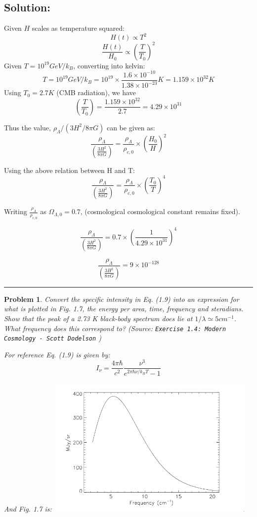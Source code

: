 \documentclass[11pt]{article}
\newenvironment{solution}{\subsection*{Solution:}}{\vspace{0.5cm} \hrule \vspace{0.7cm}}
\newtheorem{problem}{Problem}
\begin{document}
\begin{solution}
	Given $H$ scales as temperature squared:
	$$ H(t) \propto T^2 $$
	$$ \frac{H(t)}{H_0} \propto \left(\frac{T}{T_0}\right)^2 $$
	Given $T = 10^{19} GeV/k_B$, converting into kelvin:
	$$ T = 10^{19} GeV/k_B = 10^{19} \times \frac{1.6 \times 10^{-10}}{1.38
	\times 10^{-23}} K = 1.159 \times 10^{32} K$$
	Using $T_0 = 2.7 K$ (CMB radiation), we have
	$$ \left(\frac{T}{T_0}\right) = \frac{1.159 \times 10^{32} }{2.7} = 4.29
	\times 10^{31}$$

	Thus the value, $\rho_\Lambda/(3H^2/8\pi G) $ can be given as:
	$$ \frac{\rho_\Lambda}{\left(\frac{3H^2}{8\pi G}\right)} =
	\frac{\rho_\Lambda}{\rho_{c,0}} \times \left( \frac{H_0}{H} \right)^2$$

	Using the above relation between H and T:
	$$ \frac{\rho_\Lambda}{\left(\frac{3H^2}{8\pi G}\right)} =
	\frac{\rho_\Lambda}{\rho_{c,0}} \times \left( \frac{T_0}{T} \right)^4$$

	Writing $\frac{\rho_\Lambda}{\rho_{c,0}}$ as $ \Omega_{\Lambda, 0} =
	0.7$, (cosmological cosmological constant remains fixed).

	$$ \frac{\rho_\Lambda}{\left(\frac{3H^2}{8\pi G}\right)} =
	0.7 \times \left( \frac{1}{4.29 \times 10^{31}} \right)^4$$

	$$ \frac{\rho_\Lambda}{\left(\frac{3H^2}{8\pi G}\right)} =
	9 \times 10^{-128}$$
\end{solution}


\begin{problem}
	Convert the specific intensity in Eq. (1.9) into an expression for what
	is plotted in
	Fig. 1.7, the energy per area, time, frequency and steradians. Show that
	the peak of a
	2.73 K black-body spectrum does lie at $1/\lambda \simeq  5 cm^{-1}$. What frequency does this
	correspond to? (Source: \texttt{Exercise 1.4: Modern Cosmology - Scott Dodelson} )


	For reference Eq. (1.9) is given by:
	$$ I_\nu = \frac{4\pi\hbar}{c^2} \frac{\nu^3}{e^{2\pi\hbar\nu/k_BT} - 1} $$

	And Fig. 1.7 is:
	\center
	\includegraphics[width=4in]{1}
\end{problem}
\end{document}

